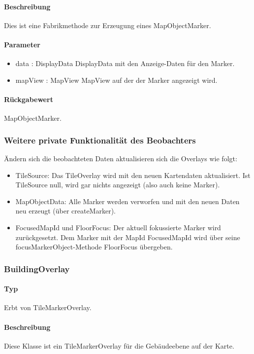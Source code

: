 \paragraph*{Beschreibung}
Dies ist eine Fabrikmethode zur Erzeugung eines MapObjectMarker.
\paragraph*{Parameter}
\begin{itemize}
    \item data : DisplayData DisplayData mit den Anzeige-Daten für den Marker.
    \item mapView : MapView MapView auf der der Marker angezeigt wird.
\end{itemize}
\paragraph*{Rückgabewert}
MapObjectMarker.


\subsubsection*{Weitere private Funktionalität des Beobachters}
Ändern sich die beobachteten Daten aktualisieren sich die Overlays wie folgt:
\begin{itemize}
    \item TileSource: Das TileOverlay wird mit den neuen Kartendaten aktualisiert.
    Ist TileSource null, wird gar nichts angezeigt (also auch keine Marker).
    \item MapObjectData: Alle Marker werden verworfen und mit den neuen Daten neu erzeugt (über createMarker).
    \item FocusedMapId und FloorFocus: Der aktuell fokussierte Marker wird zurückgesetzt.
    Dem Marker mit der MapId FocusedMapId wird über seine focusMarkerObject-Methode FloorFocus übergeben.
\end{itemize}

\subsubsection{BuildingOverlay}
\paragraph*{Typ}
Erbt von TileMarkerOverlay.
\paragraph*{Beschreibung}
Diese Klasse ist ein TileMarkerOverlay für die Gebäudeebene auf der Karte.

